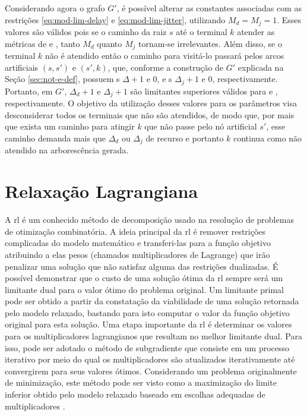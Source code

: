 Considerando  agora o  grafo $G'$,  é possível  alterar as  constantes
associadas    com    as    restrições    \eqref{eq:mod-lim-delay}    e
\eqref{eq:mod-lim-jitter}, utilizando $M_d =  M_j = 1$.  Esses valores
são válidos pois se  o caminho da raiz $s$ até  o terminal $k$ atender
as  métricas  de  {\delay}  e  {\jitter},  tanto  $M_d$  quanto  $M_j$
tornam-se irrelevantes. Além  disso, se o terminal $k$  não é atendido
então o  caminho para visitá-lo  passará pelos arcos  artificiais $(s,
s')$ e  $(s', k)$,  que, conforme  a construção  de $G'$  explicada na
Seção \ref{sec:not-e-def},  possuem {\delay s}  $\Delta + 1$ e  $0$, e
{\jitter s} $\Delta_j + 1$  e $0$, respectivamente. Portanto, em $G'$,
$\Delta_d + 1$ e $\Delta_j + 1$ são limitantes superiores válidos para
{\delay}  e  {\jitter},  respectivamente.  O  objetivo  da  utilização
desses  valores  para  os   parâmetros  visa  desconsiderar  todos  os
terminais que não  são atendidos, de modo que, por  mais que exista um
caminho para atingir  $k$ que não passe pelo nó  artificial $s'$, esse
caminho  demanda  mais  que  $\Delta_d$ ou  $\Delta_j$  de  recurso  e
portanto $k$ continua como não atendido na arborescência gerada.

\section{Relaxação Lagrangiana} \label{sec:rel-lagrangiana}

A \gls{rl} é um conhecido método de decomposição usado na resolução de
problemas de otimização combinatória. A  ideia principal da \gls{rl} é
remover restrições  complicadas do  modelo matemático  e transferi-las
para   a   função  objetivo   atribuindo   a   elas  pesos   (chamados
multiplicadores de  Lagrange) que irão  penalizar uma solução  que não
satisfaz alguma das restrições dualizadas. É possível demonstrar que o
custo de uma  solução ótima da \gls{rl} sempre será  um limitante dual
para o valor ótimo do problema original.  Um limitante primal pode ser
obtido a partir da constatação da viabilidade de uma solução retornada
pelo modelo  relaxado, bastando para  isto computar o valor  da função
objetivo original para esta solução.  Uma etapa importante da \gls{rl}
é  determinar  os valores  para  os  multiplicadores lagrangianos  que
resultam  no melhor  limitante dual.   Para isso,  pode ser  adotado o
método de subgradiente que consiste  em um processo iterativo por meio
do  qual   os  multiplicadores  são  atualizados   iterativamente  até
convergirem  para  seus  valores  ótimos.   Considerando  um  problema
originalmente  de  minimização, este  método  pode  ser visto  como  a
maximização do limite inferior obtido  pelo modelo relaxado baseado em
escolhas adequadas de multiplicadores \cite{Beasley:1993}.

